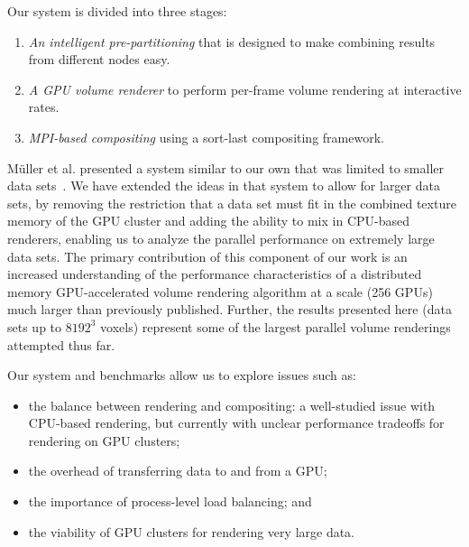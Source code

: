 Our system is divided into three stages:

\begin{enumerate}

  \item \emph{An intelligent pre-partitioning} that is designed to make
  combining results from different nodes easy.

  \item \emph{A GPU volume renderer} to perform per-frame volume
  rendering at interactive rates.

  \item \emph{MPI-based compositing} using a sort-last compositing framework.

\end{enumerate}

M\"uller et al. presented a system similar to our own that was limited
to smaller data sets~\cite{Needed}.  We have extended the ideas in that
system to allow for larger data sets, by removing the restriction that
a data set must fit in the combined texture memory of the GPU cluster
and adding the ability to mix in CPU-based renderers, enabling us to
analyze the parallel performance on extremely large data sets.  The
primary contribution of this component of our work is an increased
understanding of the performance characteristics of a distributed
memory GPU-accelerated volume rendering algorithm at a scale (256 GPUs)
much larger than previously published.  Further, the results presented
here (data sets up to $8192^3$ voxels) represent some of the largest
parallel volume renderings attempted thus far.

Our system and benchmarks allow us to explore issues such as:

\begin{itemize}

  \item the balance between rendering and compositing: a well-studied
  issue with CPU-based rendering, but currently with unclear
  performance tradeoffs for rendering on GPU clusters;

  \item the overhead of transferring data to and from a GPU;

  \item the importance of process-level load balancing; and

  \item the viability of GPU clusters for rendering very large data.

\end{itemize}

